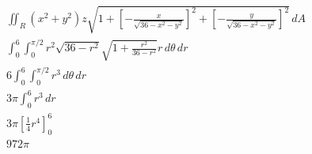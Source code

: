 \documentclass{article}
\begin{document}
\begin{align*}
  \iint_R (x^2 + y^2) z \sqrt{1 + \left[ -\frac{x}{\sqrt{36 - x^2 - y^2}} \right]^2 + \left[ -\frac{y}{\sqrt{36 - x^2 - y^2}} \right]^2} \,dA \\
  \int_0^6 \int_0^{\pi / 2} r^2 \sqrt{36 - r^2} \sqrt{1 + \frac{r^2}{36 - r^2}} r \,d\theta \,dr                                              \\
  6 \int_0^6 \int_0^{\pi / 2} r^3 \,d\theta \,dr                                                                                              \\
  3 \pi \int_0^6 r^3 \,dr                                                                                                                     \\
  3 \pi \left[ \frac{1}{4} r^4 \right]_0^6                                                                                                    \\
  972 \pi
\end{align*}

\setcounter{subsubsection}{24}
\subsubsection{}
\end{document}
